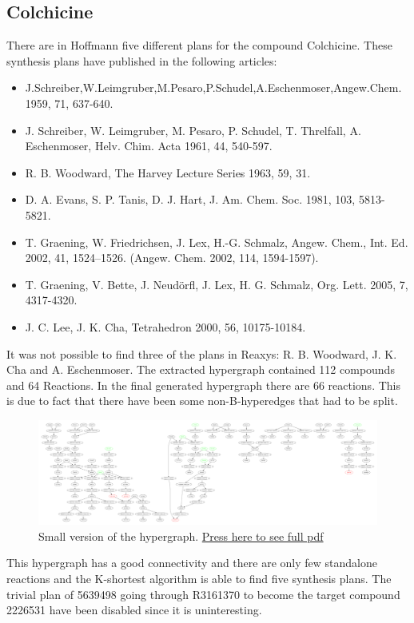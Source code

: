 \documentclass[a4paper,10pt,titlepage]{paper}
\begin{document}
\subsection{Colchicine} 
There are in Hoffmann\cite{SynthesisPlans} five different plans for the compound Colchicine. These synthesis plans have published in the following articles:
\begin{itemize}
\item
J.Schreiber,W.Leimgruber,M.Pesaro,P.Schudel,A.Eschenmoser,Angew.Chem.
1959, 71, 637-640.
\item
J. Schreiber, W. Leimgruber, M. Pesaro, P. Schudel, T. Threlfall, A. Eschenmoser,
Helv. Chim. Acta 1961, 44, 540-597.
\item
R. B. Woodward, The Harvey Lecture Series 1963, 59, 31.
\item
D. A. Evans, S. P. Tanis, D. J. Hart, J. Am. Chem. Soc. 1981, 103, 5813-5821.
\item
T. Graening, W. Friedrichsen, J. Lex, H.-G. Schmalz, Angew. Chem., Int. Ed. 2002,
41, 1524–1526. (Angew. Chem. 2002, 114, 1594-1597).
\item
T. Graening, V. Bette, J. Neudörfl, J. Lex, H. G. Schmalz, Org. Lett. 2005, 7,
4317-4320.
\item
J. C. Lee, J. K. Cha, Tetrahedron 2000, 56, 10175-10184.
\end{itemize}
It was not possible to find three of the plans in Reaxys: R. B. Woodward, J. K. Cha and A. Eschenmoser. The extracted hypergraph contained 112 compounds and 64 Reactions. In the final generated hypergraph there are 66 reactions. This is due to fact that there have been some non-B-hyperedges that had to be split.
\begin{figure}[H]
\centering
\includegraphics[scale=0.1, angle=90]{Synteseplaner/Colchicine/Output.pdf}
\caption{Small version of the hypergraph. \href{Synteseplaner/Colchicine/Output.pdf}{Press here to see full pdf}}
\end{figure} 
This hypergraph has a good connectivity and there are only few standalone reactions and the K-shortest algorithm is able to find five synthesis plans. The trivial plan of 5639498 going through R3161370 to become the target compound 2226531 have been disabled since it is uninteresting.
\end{document}
